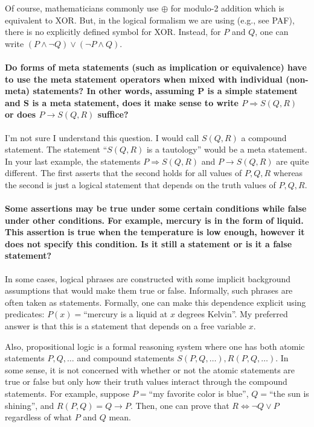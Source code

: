 \documentclass[10pt,english]{article}
\begin{document}
Of course, mathematicians commonly use $\oplus$ for modulo-2 addition which is equivalent to XOR.  But, in the logical formalism we are using (e.g., see PAF), there is no explicitly defined symbol for XOR.  Instead, for $P$ and $Q$, one can write $(P \wedge \neg Q) \vee (\neg P \wedge Q)$.

\paragraph{Do forms of meta statements (such as implication or equivalence) have to use the meta statement operators when mixed with individual (non-meta) statements? In other words, assuming P is a simple statement and S is a meta statement, does it make sense to write $P \Rightarrow S(Q,R)$ or does $P \rightarrow S(Q,R)$ suffice?}

I'm not sure I understand this question.  I would call $S(Q,R)$ a compound statement.  The statement ``$S(Q,R)$ is a tautology'' would be a meta statement.  In your last example, the statements $P \Rightarrow S(Q,R)$ and $P \rightarrow S(Q,R)$ are quite different.  The first asserts that the second holds for all values of $P,Q,R$ whereas the second is just a logical statement that depends on the truth values of $P,Q,R$.

\paragraph{Some assertions may be true under some certain conditions while false under other conditions. For example, mercury is in the form of liquid. This assertion is true when the temperature is low enough, however it does not specify this condition. Is it still a statement or is it a false statement?}

In some cases, logical phrases are constructed with some implicit background assumptions that would make them true or false.  Informally, such phrases are often taken as statements. Formally, one can make this dependence explicit using predicates: $P(x)=$``mercury is a liquid at $x$ degrees Kelvin''.  My preferred answer is that this is a statement that depends on a free variable $x$.  

Also, propositional logic is a formal reasoning system where one has both atomic statements $P,Q,\ldots$ and compound statements $S(P,Q,\ldots), R(P,Q,\ldots)$.  In some sense, it is not concerned with whether or not the atomic statements are true or false but only how their truth values interact through the compound statements.  For example, suppose $P=$``my favorite color is blue'', $Q=$``the sun is shining'', and $R(P,Q) = Q \rightarrow P$.  Then, one can prove that $R \Leftrightarrow \neg Q \vee P$ regardless of what $P$ and $Q$ mean.
\end{document}
